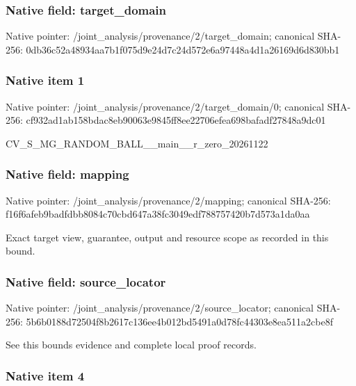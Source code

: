 \documentclass[10pt,a4paper]{article}
\begin{document}
\subsubsection{Native field: target\_domain}


Native pointer: /joint\_analysis/provenan\allowbreak{}ce/2/target\_domain; canonical SHA-256: 0db36c52a48934aa7b1f075d\allowbreak{}9e24d7c24d572e6a97448a4d\allowbreak{}1a26169d6d830bb1



\subsubsection{Native item 1}


Native pointer: /joint\_analysis/provenan\allowbreak{}ce/2/target\_domain/0; canonical SHA-256: cf932ad1ab158bdac8eb9006\allowbreak{}3e9845ff8ee22706efea698b\allowbreak{}afadf27848a9dc01


CV\_S\_MG\_RANDOM\_BALL\_\_mai\allowbreak{}n\_\_r\_zero\_20261122


\subsubsection{Native field: mapping}


Native pointer: /joint\_analysis/provenance/2/mapping; canonical SHA-256: f16f6afeb9badfdbb8084c70\allowbreak{}cbd647a38fc3049edf788757\allowbreak{}420b7d573a1da0aa


Exact target view, guarantee, output and resource scope as recorded in this bound.


\subsubsection{Native field: source\_locator}


Native pointer: /joint\_analysis/provenan\allowbreak{}ce/2/source\_locator; canonical SHA-256: 5b6b0188d72504f8b2617c13\allowbreak{}6ee4b012bd5491a0d78fc443\allowbreak{}03e8ea511a2cbe8f


See this bounds evidence and complete local proof records.


\subsubsection{Native item 4}
\end{document}
